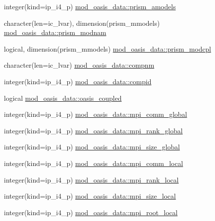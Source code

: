 \begin{DoxyCompactItemize}
\item 
integer(kind=ip\+\_\+i4\+\_\+p) \hyperlink{namespacemod__oasis__data_ac73f95bc17215d09b67c6c4d3adc07b7}{mod\+\_\+oasis\+\_\+data\+::prism\+\_\+amodels}
\item 
character(len=ic\+\_\+lvar), dimension(prism\+\_\+mmodels) \hyperlink{namespacemod__oasis__data_abd4b98e9f321bc073d5a8e0292ba7131}{mod\+\_\+oasis\+\_\+data\+::prism\+\_\+modnam}
\item 
logical, dimension(prism\+\_\+mmodels) \hyperlink{namespacemod__oasis__data_ad5282716e60cbe5e8c1ced7758fc9ae1}{mod\+\_\+oasis\+\_\+data\+::prism\+\_\+modcpl}
\item 
character(len=ic\+\_\+lvar) \hyperlink{namespacemod__oasis__data_a8379835615758ccf7a4287dde5785681}{mod\+\_\+oasis\+\_\+data\+::compnm}
\item 
integer(kind=ip\+\_\+i4\+\_\+p) \hyperlink{namespacemod__oasis__data_ab53c9f7676f84fdf1050cea5efcd3e7f}{mod\+\_\+oasis\+\_\+data\+::compid}
\item 
logical \hyperlink{namespacemod__oasis__data_a5056590b195dc981725173c79e52de3b}{mod\+\_\+oasis\+\_\+data\+::oasis\+\_\+coupled}
\item 
integer(kind=ip\+\_\+i4\+\_\+p) \hyperlink{namespacemod__oasis__data_a4bbff51054fd1746849de9defb3d5252}{mod\+\_\+oasis\+\_\+data\+::mpi\+\_\+comm\+\_\+global}
\item 
integer(kind=ip\+\_\+i4\+\_\+p) \hyperlink{namespacemod__oasis__data_af9bb2a4f321e7d7750e90c01022828fe}{mod\+\_\+oasis\+\_\+data\+::mpi\+\_\+rank\+\_\+global}
\item 
integer(kind=ip\+\_\+i4\+\_\+p) \hyperlink{namespacemod__oasis__data_a83a9d498c6829e2058675a07446ce5be}{mod\+\_\+oasis\+\_\+data\+::mpi\+\_\+size\+\_\+global}
\item 
integer(kind=ip\+\_\+i4\+\_\+p) \hyperlink{namespacemod__oasis__data_acd8801d4fab87a19c6f4f69a661d56c5}{mod\+\_\+oasis\+\_\+data\+::mpi\+\_\+comm\+\_\+local}
\item 
integer(kind=ip\+\_\+i4\+\_\+p) \hyperlink{namespacemod__oasis__data_a811747a1592795f860854f09f19d4c25}{mod\+\_\+oasis\+\_\+data\+::mpi\+\_\+rank\+\_\+local}
\item 
integer(kind=ip\+\_\+i4\+\_\+p) \hyperlink{namespacemod__oasis__data_a617f69fb4d4bb96a94f83a124b4d0030}{mod\+\_\+oasis\+\_\+data\+::mpi\+\_\+size\+\_\+local}
\item 
integer(kind=ip\+\_\+i4\+\_\+p) \hyperlink{namespacemod__oasis__data_a2c468f26bc0c9b2ad5d54d68733e7047}{mod\+\_\+oasis\+\_\+data\+::mpi\+\_\+root\+\_\+local}

\end{DoxyCompactItemize}
